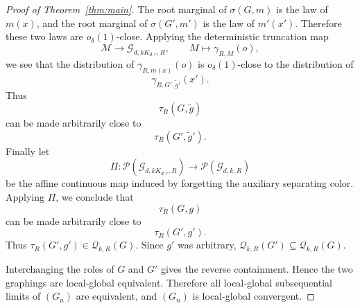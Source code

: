\documentclass[10pt,a4paper]{amsart}
\newcommand{\calG}{\mathcal G}
\newcommand{\calP}{\mathcal P}
\newcommand{\calQ}{\mathcal Q}
\begin{document}
\begin{proof}[Proof of Theorem~\ref{thm:main}]
The root marginal of $\sigma(G,m)$ is the law of $m(x)$, and the root marginal of $\sigma(G',m')$ is the law of $m'(x')$.  Therefore these two laws are $o_\delta(1)$-close.  Applying the deterministic truncation map
\[
 \mathcal M\to \calG_{d,kK_{d,r},R},\qquad M\mapsto \gamma_{R,M}(o),
\]
we see that the distribution of $\gamma_{R,m(x)}(o)$ is $o_\delta(1)$-close to the distribution of
\[
 \gamma_{R,G',\widetilde g'}(x').
\]
Thus
\[
 \tau_R(G,\widetilde g)
\]
can be made arbitrarily close to
\[
 \tau_R(G',\widetilde g').
\]
Finally let
\[
 \Pi\colon \calP(\calG_{d,kK_{d,r},R})\to \calP(\calG_{d,k,R})
\]
be the affine continuous map induced by forgetting the auxiliary separating color.  Applying $\Pi$, we conclude that
\[
 \tau_R(G,g)
\]
can be made arbitrarily close to
\[
 \tau_R(G',g').
\]
Thus $\tau_R(G',g')\in\calQ_{k,R}(G)$.  Since $g'$ was arbitrary, $\calQ_{k,R}(G')\subseteq\calQ_{k,R}(G)$.

Interchanging the roles of $G$ and $G'$ gives the reverse containment.  Hence the two graphings are local-global equivalent.  Therefore all local-global subsequential limits of $(G_n)$ are equivalent, and $(G_n)$ is local-global convergent.
\end{proof}
\end{document}
